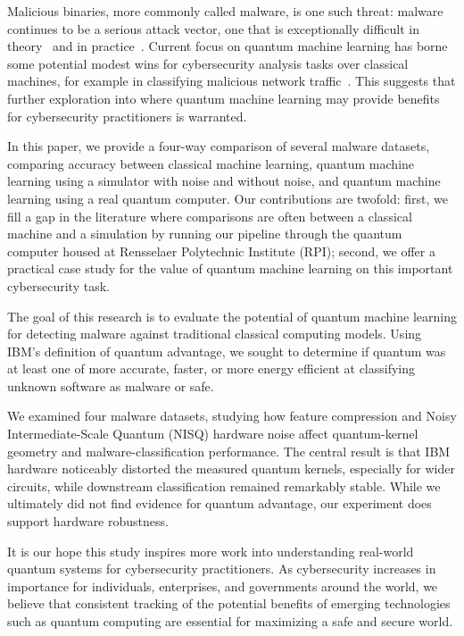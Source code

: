 \documentclass[letterpaper]{article} %
\begin{document}
Malicious binaries, more commonly called malware, is one such threat: malware continues to be a serious attack vector, one that is exceptionally difficult in theory~\cite{cohen1987computer} and in practice~\cite{pachhala}. Current focus on quantum machine learning has borne some potential modest wins for cybersecurity analysis tasks over classical machines, for example in classifying malicious network traffic~\cite{cotrupi}. This suggests that further exploration into where quantum machine learning may provide benefits for cybersecurity practitioners is warranted.

In this paper, we provide a four-way comparison of several malware datasets, comparing accuracy between classical machine learning, quantum machine learning using a simulator with noise and without noise, and quantum machine learning using a real quantum computer. Our contributions are twofold: first, we fill a gap in the literature where comparisons are often between a classical machine and a simulation by running our pipeline through the quantum computer housed at Rensselaer Polytechnic Institute (RPI); second, we offer a practical case study for the value of quantum machine learning on this important cybersecurity task.

The goal of this research is to evaluate the potential of quantum machine learning for detecting malware against traditional classical computing models. Using IBM’s definition of quantum advantage, we sought to determine if quantum was at least one of more accurate, faster, or more energy efficient at classifying unknown software as malware or safe. 

We examined four malware datasets, studying how feature compression and Noisy Intermediate-Scale Quantum (NISQ) hardware noise affect quantum-kernel geometry and malware-classification performance. The central result is that IBM hardware noticeably distorted the measured quantum kernels, especially for wider circuits, while downstream classification remained remarkably stable. While we ultimately did not find evidence for quantum advantage, our experiment does support hardware robustness.

It is our hope this study inspires more work into understanding real-world quantum systems for cybersecurity practitioners. As cybersecurity increases in importance for individuals, enterprises, and governments around the world, we believe that consistent tracking of the potential benefits of emerging technologies such as quantum computing are essential for maximizing a safe and secure world.
\end{document}
